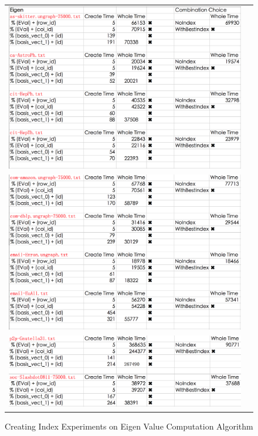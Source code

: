 \begin{figure}[H]
\begin{center}
\begin{tabular}{cc}
     \includegraphics[width=1.0\textwidth]{FIG/Eigen1.png} \\
     \includegraphics[width=1.0\textwidth]{FIG/Eigen2.png} \\
     \includegraphics[width=1.0\textwidth]{FIG/Eigen3.png} \\
\end{tabular}
\caption{Creating Index Experiments on Eigen Value Computation Algorithm}
\end{center}
\end{figure}

